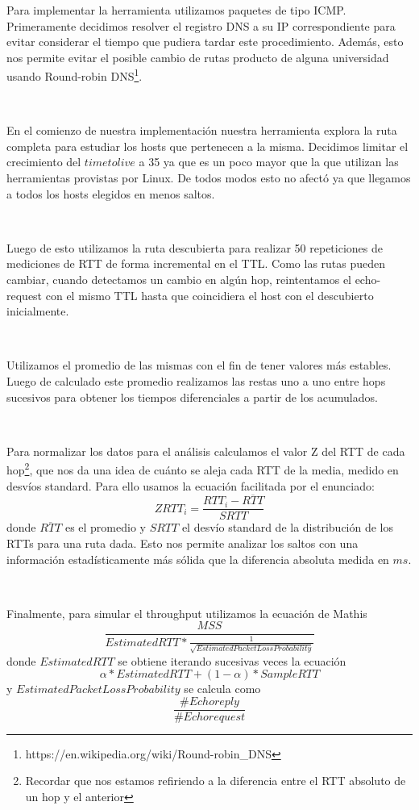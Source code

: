 Para implementar la herramienta utilizamos paquetes de tipo ICMP.
Primeramente decidimos resolver el registro DNS a su IP correspondiente para evitar considerar el tiempo que pudiera tardar este procedimiento. Además, esto nos permite evitar el posible cambio de rutas producto de alguna universidad usando Round-robin DNS\footnote{https://en.wikipedia.org/wiki/Round-robin\_DNS}.

~

En el comienzo de nuestra implementación nuestra herramienta explora la ruta completa para estudiar los hosts que pertenecen a la misma. Decidimos limitar el crecimiento del $time to live$ a 35 ya que es un poco mayor que la que utilizan las herramientas provistas por Linux. De todos modos esto no afectó ya que llegamos a todos los hosts elegidos en menos saltos.

~

Luego de esto utilizamos la ruta descubierta para realizar 50 repeticiones de mediciones de RTT de forma incremental en el TTL. Como las rutas pueden cambiar, cuando detectamos un cambio en algún hop, reintentamos el echo-request con el mismo TTL hasta que coincidiera el host con el descubierto inicialmente.

~

Utilizamos el promedio de las mismas con el fin de tener valores más estables. Luego de calculado este promedio realizamos las restas uno a uno entre hops sucesivos para obtener los tiempos diferenciales a partir de los acumulados.

~

Para normalizar los datos para el análisis calculamos el valor Z del RTT de cada hop\footnote{Recordar que nos estamos refiriendo a la diferencia entre el RTT absoluto de un hop y el anterior}, que nos da una idea de cuánto se aleja cada RTT de la media, medido en desvíos standard. Para ello usamos la ecuación facilitada por el enunciado: $$ ZRTT_i = \dfrac{RTT_i-\overline{RTT}}{SRTT}$$ donde $\overline{RTT}$ es el promedio y $SRTT$ el desvío standard de la distribución de los RTTs para una ruta dada. Esto nos permite analizar los saltos con una información estadísticamente más sólida que la diferencia absoluta medida en $ms$.

~

Finalmente, para simular el throughput utilizamos la ecuación de Mathis
$$\frac{MSS}{EstimatedRTT * \frac{1}{\sqrt{EstimatedPacketLossProbability}}}$$
donde $EstimatedRTT$ se obtiene iterando sucesivas veces la ecuación
$$\alpha * EstimatedRTT + (1 - \alpha) * SampleRTT$$
y $EstimatedPacketLossProbability$ se calcula como $$\frac{\#Echo reply}{\#Echo request}$$

